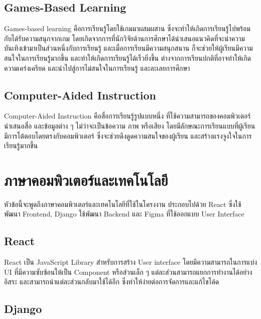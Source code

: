 \documentclass[12pt,oneside,openright,a4paper]{cpe-thai-project}
\begin{document}
\subsection{Games-Based Learning \cite{GBL}}

\hspace{1cm}
Games-based learning คือการเรียนรู้โดยใช้เกมมาผสมผสาน ซึ่งจะทำให้เกิดการเรียนรู้ไปพร้อมกับได้รับความสนุกจากเกม
โดยเกิดจากการที่นักวิจัยด้านการศึกษาได้นำเสนอแนวคิดที่จะนำความบันเทิงเข้ามาเป็นส่วนหนึ่งกับการเรียนรู้ และเมื่อการเรียนมีความสนุกสนาน
ก็จะช่วยให้ผู้เรียนมีความสนใจในการเรียนรู้มากขึ้น และทำให้เกิดการเรียนรู้ได้เร็วยิ่งขึ้น ต่างจากการเรียนปกติที่อาจทำให้เกิดความเคร่งเครียด
และนำไปสู่การไม่สนใจในการเรียนรู้ และละเลยการศึกษา

\subsection{Computer-Aided Instruction \cite{CAI1,CAI2}}

\hspace{1cm}
Computer-Aided Instruction คือสื่อการเรียนรู้รูปแบบหนึ่ง ที่ใช้ความสามารถของคอมพิวเตอร์นำเสนอสื่อ และข้อมูลต่าง ๆ
ไม่ว่าจะเป็นข้อความ ภาพ หรือเสียง โดยมีลักษณะการเรียนแบบที่ผู้เรียนมีการโต้ตอบโดยตรงกับคอมพิวเตอร์
ซึ่งจะช่วยดึงดูดความสนใจของผู้เรียน และสร้างแรงจูงใจในการเรียนรู้มากขึ้น


\pagebreak
\section{ภาษาคอมพิวเตอร์และเทคโนโลยี}

\hspace{1cm}
หัวข้อนี้จะพูดถึงภาษาคอมพิวเตอร์และเทคโนโลยีที่ใช้ในโครงงาน ประกอบไปด้วย React
ซึ่งใช้พัฒนา Frontend, Django ใช้พัฒนา Backend และ Figma ที่ใช้ออกแบบ User Interface

\subsection{React \cite{React}}

\hspace{1cm}
React เป็น JavaScript Library สำหรับการสร้าง User interface โดยมีความสามารถในการแบ่ง UI ที่มีความซับซ้อนให้เป็น Component หรือส่วนเล็ก ๆ
แต่ละส่วนสามารถแยกการทำงานได้อย่างอิสระ และสามารถนำแต่ละส่วนกลับมาใช้ได้อีก ซึ่งทำให้ง่ายต่อการจัดการและแก้ไขโค้ด

\subsection{Django \cite{Django}}
\end{document}
